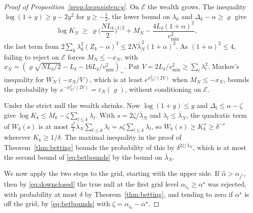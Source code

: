 \begin{proof}[Proof of Proposition~\ref{prop:loconsistency}]
On $\mathcal E$ the wealth grows. The inequality $\log(1+y)\ge y-2y^2$ for $y\ge-\frac12$, the lower bound on
$\lambda_k$ and $\Delta_k-\alpha\ge\varrho$ give
\[
\log K_N\ \ge\ \varrho\Big(\frac{NL_\delta}2\Big)^{1/2}+M_N-\frac{4L_\delta(1+\alpha)^2}{v^2_{\min}},
\]
the last term from $2\sum_k\lambda_k^2(Z_k-\alpha)^2\le2N\overline\lambda_N^{\,2}(1+\alpha)^2$. As $(1+\alpha)^2\le4$,
failing to reject on $\mathcal E$ forces $M_N\le-x_N$, with
$x_N=(\varrho\sqrt{NL_\delta/2}-L_\delta-16L_\delta/v^2_{\min})_+$. Put $V=2L_\delta/v^2_{\min}\ge\sum_l\lambda_l^2$.
Markov's inequality for $W_N(-x_N/V)$, which is at least $e^{x_N^2/(2V)}$ when $M_N\le-x_N$, bounds the probability
by $e^{-x_N^2/(2V)}=\varepsilon_N(\varrho)$, without conditioning on $\mathcal E$.

Under the strict null the wealth shrinks. Now $\log(1+y)\le y$ and $\Delta_l\le\alpha-\zeta$ give
$\log K_k\le M_k-\zeta\sum_{l\le k}\lambda_l$. With $s=2\zeta/\overline\lambda_N$ and $\lambda_l\le\overline\lambda_N$,
the quadratic term of $W_k(s)$ is at most $\frac{s^2}2\overline\lambda_N\sum_{l\le k}\lambda_l=s\zeta\sum_{l\le k}
\lambda_l$, so $W_k(s)\ge K_k^{\,s}\ge\delta^{-s}$ wherever $K_k\ge1/\delta$. The maximal inequality in the proof of
Theorem~\ref{thm:betting} bounds the probability of this by $\delta^{2\zeta/\overline\lambda_N}$, which is at most the
second bound of \eqref{eq:betbounds} by the bound on $\overline\lambda_N$.

We now apply the two steps to the grid, starting with the upper side. If $\widehat\alpha>\alpha_{j^\star}$, then by
\eqref{eq:downclosed} the true null at the first grid level $\alpha_{i_0}\ge\alpha^\star$ was rejected, with probability
at most $\delta$ by Theorem~\ref{thm:betting}, and tending to zero if $\alpha^\star$ is off the grid, by
\eqref{eq:betbounds} with $\zeta=\alpha_{i_0}-\alpha^\star$.


\end{proof}
